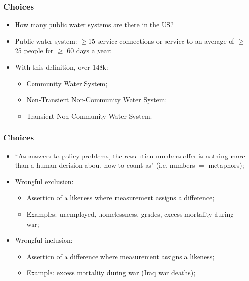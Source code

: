 \documentclass[aspectratio=169]{beamer}
\theoremstyle{principle}
\begin{document}
\begin{frame}
\frametitle{Choices}

\begin{itemize}
\item How many public water systems are there in the US?
\bigskip
\bigskip
\item Public water system: $\geq$15 service connections or service to an average of $\geq$ 25 people for $\geq$ 60 days a year;
\bigskip
\bigskip
\item With this definition, over 148k;
\begin{itemize}
\item Community Water System;
\item Non-Transient Non-Community Water System;
\item Transient Non-Community Water System.
\end{itemize}
\end{itemize}

\end{frame}



\begin{frame}
\frametitle{Choices}
\begin{itemize}
\item ``As answers to policy problems, the resolution numbers offer is nothing more than a human decision about how to count as"  (i.e. numbers $=$ metaphors);
\bigskip
\bigskip
\item Wrongful exclusion:
\begin{itemize}
\item Assertion of a likeness where measurement assigns a difference;
\item Examples: unemployed, homelessness, grades, excess mortality during war;
\end{itemize}
\bigskip
\bigskip
\item Wrongful inclusion:
\begin{itemize}
\item Assertion of a difference where measurement assigns a likeness;
\item Example: excess mortality during war (Iraq war deaths);
\end{itemize}
\end{itemize}
\end{frame}
\end{document}
